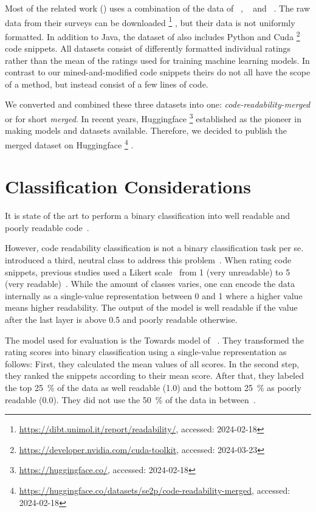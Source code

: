 \documentclass[%
class=scrreprt,
chapterprefix=false,%
open=right,%
twoside=true,%
paper=a4,%
logofile={Logo\_zentral\_farbig\_EN.png},%
thesistype=master,%
UKenglish,%
]{se2thesis}
\newcounter{urlfootnote}
\newcommand{\onecurl}[2]{%
	\stepcounter{urlfootnote}%
	\expandafter\def\csname urlfootnote:#1\endcsname{\theurlfootnote}%
	\footnote{\label{url:#1}\url{#1}, accessed: #2}%
}
\newcommand{\curl}[2]{%
		\onecurl{#1}{#2}%
}
\theoremstyle{definition}
\newcommand{\citeolddataset}{\cite{buse2009learning, dorn2012general, scalabrino2018comprehensive}\xspace}
\begin{document}
	Most of the related work () uses a combination of the data of \citeauthor{buse2009learning}~\cite{buse2009learning}, \citeauthor{dorn2012general}~\cite{dorn2012general} and \citeauthor{scalabrino2018comprehensive}~\cite{scalabrino2018comprehensive}. The raw data from their surveys can be downloaded\curl{https://dibt.unimol.it/report/readability/}{2024-02-18}, but their data is not uniformly formatted. In addition to Java, the dataset of \citeauthor{dorn2012general} also includes Python and Cuda\curl{https://developer.nvidia.com/cuda-toolkit}{2024-03-23} code snippets. All datasets consist of differently formatted individual ratings rather than the mean of the ratings used for training machine learning models. In contrast to our mined-and-modified code snippets theirs do not all have the scope of a method, but instead consist of a few lines of code.
	
	We converted and combined these three datasets into one: \textit{code-readability-merged} or for short \textit{merged}. 
	In recent years, Huggingface\curl{https://huggingface.co/}{2024-02-18} established as the pioneer in making models and datasets available. Therefore, we decided to publish the merged dataset on Huggingface\curl{https://huggingface.co/datasets/se2p/code-readability-merged}{2024-02-18}.
	
\section{Classification Considerations} \label{Classification Considerations}
	
	It is state of the art to perform a binary classification into well readable and poorly readable code~\cite{mi2018inception, mi2018improving, sharma2020egan, mi2022towards, mi2022rank}. 
	
	However, code readability classification is not a binary classification task per se. \citeauthor{mi2023graph} introduced a third, neutral class to address this problem~\cite{mi2023graph}. 
	When rating code snippets, previous studies used a Likert scale~\cite{likert1932technique} from 1 (very unreadable) to 5 (very readable)~\citeolddataset. 
	While the amount of classes varies, one can encode the data internally as a single-value representation between 0 and 1 where a higher value means higher readability. The output of the model is well readable if the value after the last layer is above 0.5 and poorly readable otherwise.
	
	The model used for evaluation is the Towards model of \citeauthor{mi2022towards}~\cite{mi2022towards}. They transformed the rating scores into binary classification using a single-value representation as follows: First, they calculated the mean values of all scores. In the second step, they ranked the snippets according to their mean score. After that, they labeled the top 25~\% of the data as well readable (1.0) and the bottom 25~\% as poorly readable (0.0). They did not use the 50~\% of the data in between~\cite{mi2022towards}.
	
\end{document}
